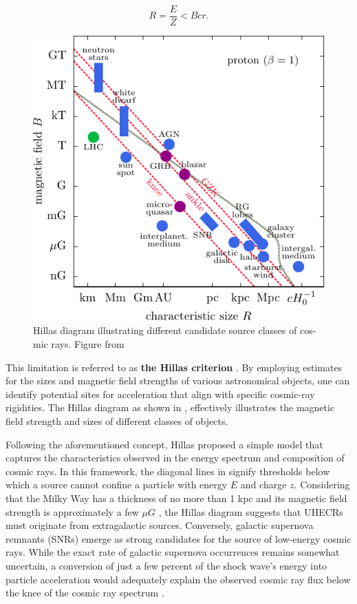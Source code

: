 \begin{equation}
    R = \frac{E}{Z} < Bcr.
\end{equation}

\begin{figure}[h]
    \caption{Hillas diagram illustrating different candidate source classes of cos- mic rays. Figure from \cite{hillas_plot}}
    \includegraphics{./figures/nu_he/Hillas_simple.pdf}
\end{figure}

This limitation is referred to as \textbf{the Hillas criterion} . By employing estimates for the sizes and magnetic field strengths of various astronomical objects, one can identify potential sites for acceleration that align with specific cosmic-ray rigidities. The Hillas diagram as shown in , effectively illustrates the magnetic field strength and sizes of different classes of objects.

Following the aforementioned concept, Hillas proposed a simple model that captures the characteristics observed in the energy spectrum and composition of cosmic rays. In this framework, the diagonal lines in  signify thresholds below which a source cannot confine a particle with energy \(E\) and charge \(z\). Considering that the Milky Way has a thickness of no more than 1 kpc  and its magnetic field strength is approximately a few $\mu G$ , the Hillas diagram suggests that UHECRs must originate from extragalactic sources. Conversely, galactic supernova remnants (SNRs) emerge as strong candidates for the source of low-energy cosmic rays. While the exact rate of galactic supernova occurrences remains somewhat uncertain, a conversion of just a few percent of the shock wave's energy into particle acceleration would adequately explain the observed cosmic ray flux  below the knee of the cosmic ray spectrum .

